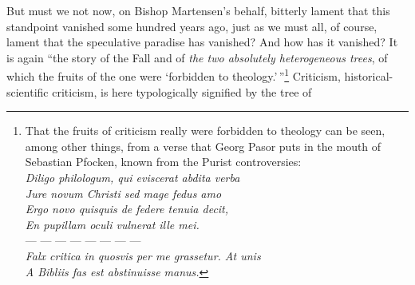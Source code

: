 \documentclass[12pt]{book}
\newcommand{\opage}[1]{\marginnote{\footnotesize\textit{[#1]}}}
\begin{document}
But must we not now, on Bishop Martensen's behalf, bitterly lament that this standpoint vanished some hundred years ago, just as we must all, of course, lament that the speculative paradise has vanished? And how has it vanished? It is again ``the story of the Fall and of \emph{the two absolutely heterogeneous trees}, of which the fruits of the one were `forbidden to theology.'\,''\footnote{That the fruits of criticism really were forbidden to theology can be seen, among other things, from a verse that Georg Pasor puts in the mouth of Sebastian Pfocken, known from the Purist controversies:\\
\hspace*{2em}\textit{Diligo philologum, qui eviscerat abdita verba}\\
\hspace*{2em}\textit{Jure novum Christi sed mage fedus amo}\\
\hspace*{2em}\textit{Ergo novo quisquis de federe tenuia decit,}\\
\hspace*{2em}\textit{En pupillam oculi vulnerat ille mei.}\\
\hspace*{2em}--- --- --- --- --- --- --- ---\\
\hspace*{2em}\textit{Falx critica in quosvis per me grassetur. At unis}\\
\hspace*{2em}\textit{A Bibliis fas est abstinuisse manus.}} Criticism, historical-scientific criticism, is here typologically signified by the tree of
\opage{48}\setcounter{footnote}{0}%
\end{document}
